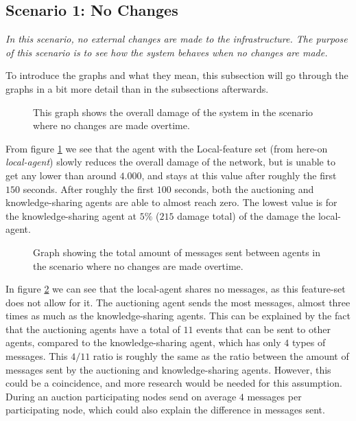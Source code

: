 \subsection{Scenario 1: No Changes}
\textit{In this scenario, no external changes are made to the infrastructure. The purpose of this scenario is to see how the system behaves when no changes are made.}

To introduce the graphs and what they mean, this subsection will go through the graphs in a bit more detail than in the subsections afterwards. 

\begin{figure}[H]
    \centering
    
    \caption{This graph shows the overall damage of the system in the scenario where no changes are made overtime.}
    \label{fig:overall-damage-no-change}
\end{figure}

From figure \ref{fig:overall-damage-no-change} we see that the agent with the Local-feature set (from here-on \textit{local-agent}) slowly reduces the overall damage of the network, but is unable to get any lower than around $4.000$, and stays at this value after roughly the first $150$ seconds.
After roughly the first $100$ seconds, both the auctioning and knowledge-sharing agents are able to almost reach zero. The lowest value is for the knowledge-sharing agent at  $5\%$ ($215$ damage total) of the damage the local-agent.

\begin{figure}[H]
    \centering
    
    \caption{Graph showing the total amount of messages sent between agents in the scenario where no changes are made overtime.}
    \label{fig:messages-no-change}
\end{figure}

In figure \ref{fig:messages-no-change} we can see that the local-agent shares no messages, as this feature-set does not allow for it. The auctioning agent sends the most messages, almost three times as much as the knowledge-sharing agents. This can be explained by the fact that the auctioning agents have a total of $11$ events that can be sent to other agents, compared to the knowledge-sharing agent, which has only $4$ types of messages. This $4 / 11$ ratio is roughly the same as the ratio between the amount of messages sent by the auctioning and knowledge-sharing agents. However, this could be a coincidence, and more research would be needed for this assumption. During an auction participating nodes send on average $4$ messages per participating node, which could also explain the difference in messages sent. 

